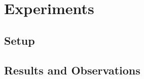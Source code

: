 \chapter{Experiments}
\label{ch:experiments}



\section{Setup}


\section{Results and Observations}


